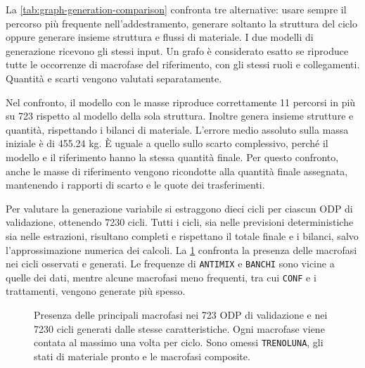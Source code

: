 La \cref{tab:graph-generation-comparison} confronta tre alternative: usare sempre il percorso più frequente nell'addestramento, generare soltanto la struttura del ciclo oppure generare insieme struttura e flussi di materiale. I due modelli di generazione ricevono gli stessi input. Un grafo è considerato esatto se riproduce tutte le occorrenze di macrofase del riferimento, con gli stessi ruoli e collegamenti. Quantità e scarti vengono valutati separatamente.



Nel confronto, il modello con le masse riproduce correttamente 11 percorsi in più su 723 rispetto al modello della sola struttura. Inoltre genera insieme strutture e quantità, rispettando i bilanci di materiale. L'errore medio assoluto sulla massa iniziale è di \num{455.24} kg. È uguale a quello sullo scarto complessivo, perché il modello e il riferimento hanno la stessa quantità finale. Per questo confronto, anche le masse di riferimento vengono ricondotte alla quantità finale assegnata, mantenendo i rapporti di scarto e le quote dei trasferimenti.

Per valutare la generazione variabile si estraggono dieci cicli per ciascun ODP di validazione, ottenendo \num{7230} cicli. Tutti i cicli, sia nelle previsioni deterministiche sia nelle estrazioni, risultano completi e rispettano il totale finale e i bilanci, salvo l'approssimazione numerica dei calcoli. La \cref{fig:graph-generation-phases} confronta la presenza delle macrofasi nei cicli osservati e generati. Le frequenze di \texttt{ANTIMIX} e \texttt{BANCHI} sono vicine a quelle dei dati, mentre alcune macrofasi meno frequenti, tra cui \texttt{CONF} e i trattamenti, vengono generate più spesso.

\begin{figure}[htbp]
\centering
{}
\caption{Presenza delle principali macrofasi nei 723 ODP di validazione e nei \num{7230} cicli generati dalle stesse caratteristiche. Ogni macrofase viene contata al massimo una volta per ciclo. Sono omessi \texttt{TRENOLUNA}, gli stati di materiale pronto e le macrofasi composite.}
\label{fig:graph-generation-phases}
\end{figure}

